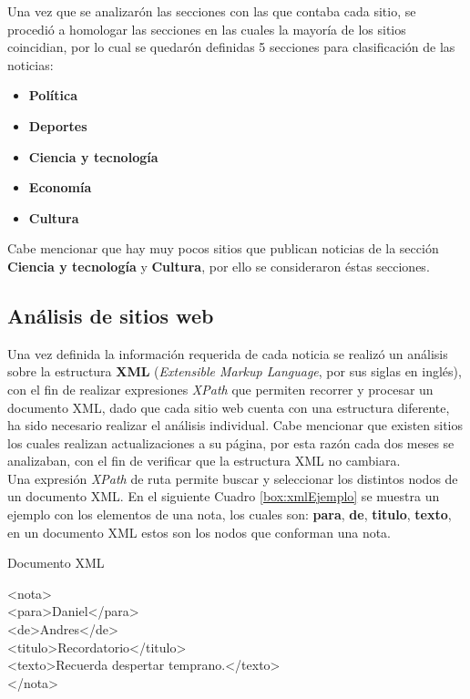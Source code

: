 Una vez que se analizarón las secciones con las que contaba cada sitio, se procedió a homologar las secciones en las cuales la mayoría de los sitios coincidian, por lo cual se quedarón definidas 5 secciones para clasificación de las noticias:

\begin{itemize}
    \item \textbf{Política}
    \item \textbf{Deportes}
    \item \textbf{Ciencia y tecnología}
    \item \textbf{Economía}
    \item \textbf{Cultura}
\end{itemize}

Cabe mencionar que hay muy pocos sitios que publican noticias de la sección \textbf{Ciencia y tecnología} y \textbf{Cultura}, por ello se consideraron éstas secciones.

\subsection{Análisis de sitios web}

Una vez definida la información requerida de cada noticia se realizó un análisis sobre la estructura \textbf{XML} (\textit{Extensible Markup Language}, por sus siglas en inglés), con el fin de realizar expresiones \textit{XPath} que permiten recorrer y procesar un documento XML, dado que cada sitio web cuenta con una estructura diferente, ha sido necesario realizar el análisis individual. Cabe mencionar que existen sitios los cuales realizan actualizaciones a su página, por esta razón cada dos meses se analizaban, con el fin de verificar que la estructura XML no cambiara.\\

Una expresión \textit{XPath} de ruta permite buscar y seleccionar los distintos nodos de un documento XML. En el siguiente Cuadro \ref{box:xmlEjemplo} se muestra un ejemplo con los elementos de una nota, los cuales son: \textbf{para}, \textbf{de}, \textbf{titulo}, \textbf{texto}, en un documento XML estos son los nodos que conforman una nota.\\

\begin{mygraybox}[label={box:xmlEjemplo}]{Documento XML}
\begin{tabbing}
<nota> \= \\\kill
\>	<para>Daniel</para>\\
\>	<de>Andres</de>\\
\>	<titulo>Recordatorio</titulo>\\
\>	<texto>Recuerda despertar temprano.</texto>\\
</nota>
\end{tabbing}
\end{mygraybox}

